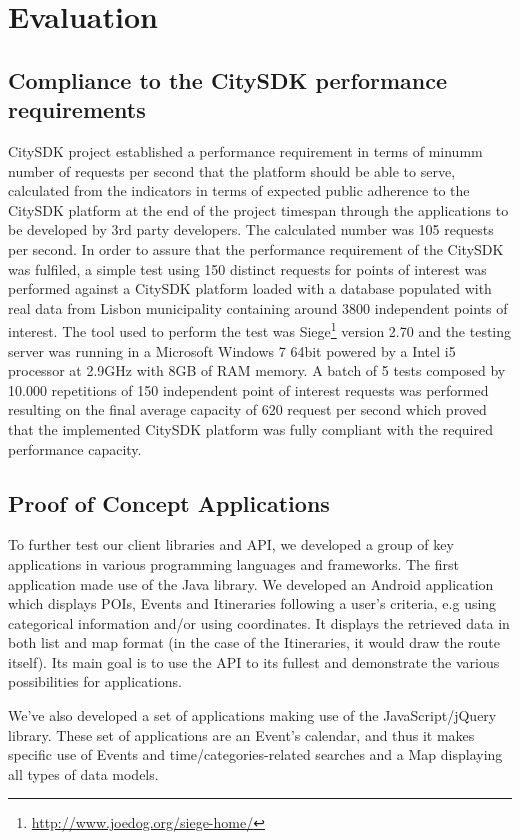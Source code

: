 \documentclass[times]{ettauth}
\begin{document}
\section{Evaluation}

\subsection{Compliance to the CitySDK performance requirements}
CitySDK project established a performance requirement in terms of minumm number of requests per second that the platform should be able to serve, calculated from the indicators in terms of expected public adherence to the CitySDK platform at the end of the project timespan through the applications to be developed by 3rd party developers. The calculated number was 105 requests per second. 
In order to assure that the performance requirement of the CitySDK was fulfiled, a simple test using 150 distinct requests for points of interest was performed against a CitySDK platform loaded with a database populated with real data from Lisbon municipality containing around 3800 independent points of interest. The tool used to perform the test was Siege\footnote{\url{http://www.joedog.org/siege-home/}} version 2.70 and the testing server was running in a Microsoft Windows 7 64bit powered by a Intel i5 processor at 2.9GHz with 8GB of RAM memory.
A batch of 5 tests composed by 10.000 repetitions of 150 independent point of interest requests was performed resulting on the final average capacity of 620 request per second which proved that the implemented CitySDK platform was fully compliant with the required performance capacity.

\subsection{Proof of Concept Applications}
To further test our client libraries and API, we developed a group of key applications in various programming languages and frameworks.
The first application made use of the Java library. We developed an Android application which displays \acp{POI}, Events and Itineraries following a user's criteria, e.g using categorical information and/or using coordinates. It displays the retrieved data in both list and map format (in the case of the Itineraries, it would draw the route itself). Its main goal is to use the API to its fullest and demonstrate the various possibilities for applications.

We've also developed a set of applications making use of the JavaScript/jQuery library. These set of applications are an Event's calendar, and thus it makes specific use of Events and time/categories-related searches and a Map displaying all types of data models.
\end{document}

